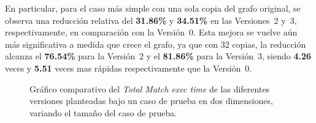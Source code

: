 En particular, para el caso más simple con una sola copia del grafo original, se observa una reducción relativa del \textbf{31{.}86\%} y \textbf{34{.}51\%} en las Versiones~2 y~3, respectivamente, en comparación con la Versión~0. Esta mejora se vuelve aún más significativa a medida que crece el grafo, ya que con 32 copias, la reducción alcanza el \textbf{76{.}54\%} para la Versión~2 y el \textbf{81{.}86\%} para la Versión~3, siendo \textbf{4{.}26} veces y \textbf{5{.}51} veces mas rápidas respectivamente que la Versión~0.

\begin{table}[ht]
\centering
{}
\caption{Cuadro comparativo del \textit{Total Match exec time} de las diferentes versiones planteadas bajo un caso de prueba en dos dimensiones, variando el tamaño del caso de prueba}
\label{tab:caso-2dim-match}
\end{table}



\begin{figure}[htbp]
  \centering
  \caption{Gráfico comparativo del \textit{Total Match exec time} de las diferentes versiones planteadas bajo un caso de prueba en dos dimensiones, variando el tamaño del caso de prueba.}
  \label{fig:caso-2dim-match2}
\end{figure}



